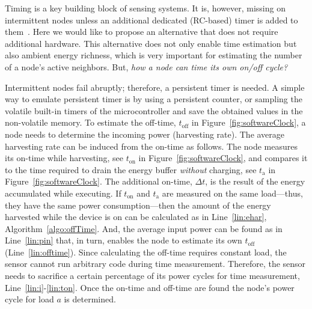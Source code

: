%
Timing is a key building block of sensing systems. It is, however, missing on intermittent nodes unless an additional dedicated (RC-based) timer is added to them~\cite{hester2017timely}. Here we would like to propose an alternative that does not require additional hardware. This alternative does not only enable time estimation but also ambient energy richness, which is very important for estimating the number of a node's active neighbors. But, \textit{how a node can time its own on/off cycle?}

Intermittent nodes fail abruptly; therefore, a persistent timer is needed. A simple way to emulate persistent timer is by using a persistent counter, or sampling the volatile built-in timers of the microcontroller and save the obtained values in the non-volatile memory. To estimate the off-time, $t_\text{off}$ in Figure~\ref{fig:softwareClock}, a node needs to determine the incoming power (harvesting rate). The average harvesting rate can be induced from the on-time as follows.
%
The node measures its on-time while harvesting, see $t_\text{on}$ in Figure~\ref{fig:softwareClock}, and compares it to the time required to drain the energy buffer \emph{without} charging, see $t_\text{a}$ in Figure~\ref{fig:softwareClock}. The additional on-time, $\Delta t$, is the result of the energy accumulated while executing. 
%
If $t_\text{on}$ and $t_\text{a}$ are measured on the same load---thus, they have the same power consumption---then the amount of the energy harvested while the device is on can be calculated as in Line~\ref{lin:ehar}, Algorithm~\ref{algo:offTime}. And, the average input power can be found as in Line~\ref{lin:pin} that, in turn, enables the node to estimate its own $t_\text{off}$ (Line~\ref{lin:offtime}).
Since calculating the off-time requires constant load, the sensor cannot run arbitrary code during time measurement. Therefore, the sensor needs to sacrifice a certain percentage of its power cycles for time measurement, Line~\ref{lin:i}-\ref{lin:ton}. Once the on-time and off-time are found the node's power cycle for load $a$ is determined.


